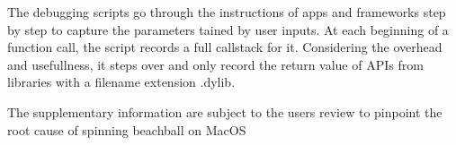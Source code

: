 The debugging scripts go through the instructions of apps and frameworks step
by step to capture the parameters tained by user inputs. At each beginning of
a function call, the script records a full callstack for it. Considering the
overhead and usefullness, it steps over and only record the return value of APIs
from libraries with a filename extension .dylib.

The supplementary information are subject to the users review to pinpoint the
root cause of spinning beachball on MacOS

